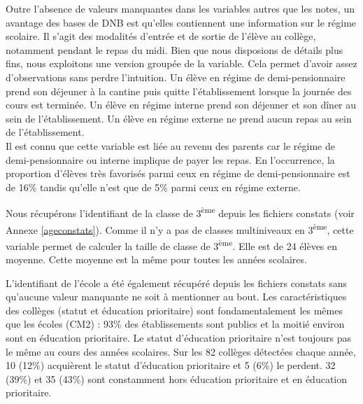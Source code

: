 \documentclass[
]{book}
\begin{document}
\quad Outre l'absence de valeurs manquantes dans les variables autres que les notes, un avantage des bases de DNB est qu'elles contiennent une information sur le régime scolaire. Il s'agit des modalités d'entrée et de sortie de l'élève au collège, notamment pendant le repas du midi. Bien que nous disposions de détails plus fins, nous exploitons une version groupée de la variable. Cela permet d'avoir assez d'observations sans perdre l'intuition. Un élève en régime de demi-pensionnaire prend son déjeuner à la cantine puis quitte l'établissement lorsque la journée des cours est terminée. Un élève en régime interne prend son déjeuner et son dîner au sein de l'établissement. Un élève en régime externe ne prend aucun repas au sein de l'établissement.\\
Il est connu que cette variable est liée au revenu des parents car le régime de demi-pensionnaire ou interne implique de payer les repas. En l'occurrence, la proportion d'élèves très favorisés parmi ceux en régime de demi-pensionnaire est de 16\% tandis qu'elle n'est que de 5\% parmi ceux en régime externe.

\quad Nous récupérons l'identifiant de la classe de 3\textsuperscript{ème} depuis les fichiers constats (voir Annexe \ref{ageconstats}). Comme il n'y a pas de classes multiniveaux en 3\textsuperscript{ème}, cette variable permet de calculer la taille de classe de 3\textsuperscript{ème}. Elle est de 24 élèves en moyenne. Cette moyenne est la même pour toutes les années scolaires.

\quad L'identifiant de l'école a été également récupéré depuis les fichiers constats sans qu'aucune valeur manquante ne soit à mentionner au bout. Les caractéristiques des collèges (statut et éducation prioritaire) sont fondamentalement les mêmes que les écoles (CM2) : 93\% des établissements sont publics et la moitié environ sont en éducation prioritaire. Le statut d'éducation prioritaire n'est toujours pas le même au cours des années scolaires. Sur les 82 collèges détectées chaque année, 10 (12\%) acquièrent le statut d'éducation prioritaire et 5 (6\%) le perdent. 32 (39\%) et 35 (43\%) sont constamment hors éducation prioritaire et en éducation prioritaire.

\newpage
\end{document}
